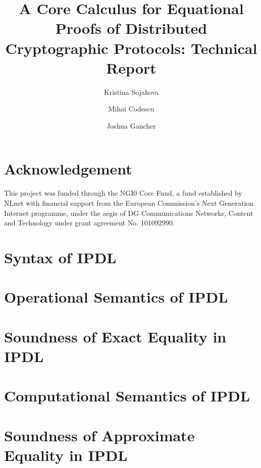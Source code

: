 \documentclass[11pt,hidelinks]{article}
\begin{document}
\title{A Core Calculus for Equational Proofs of Distributed Cryptographic Protocols: Technical Report}
\author{Kristina Sojakova \and Mihai Codescu \and Joshua Gancher}

\maketitle

\section*{\small Acknowledgement}
This project was funded through the NGI0 Core Fund, a fund established by NLnet with financial support from the European Commission's Next Generation Internet programme, under the aegis of DG Communications Networks, Content and Technology under grant agreement No. 101092990.
\section{Syntax of IPDL}


\section{Operational Semantics of IPDL}


\section{Soundness of Exact Equality in IPDL}


\section{Computational Semantics of IPDL}


\section{Soundness of Approximate Equality in IPDL}


%

 

\end{document}
